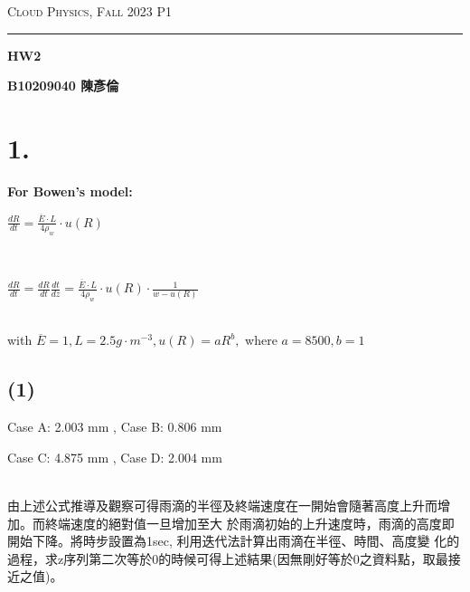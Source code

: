 \documentclass{article}
\author{B10209040 陳彥倫}
\begin{document}
\thispagestyle{empty}
\hfill {\scshape \large Cloud Physics, Fall 2023 } \hfill {\scshape P1}
\smallskip
\hrule
\begin{CJK*}{UTF8}{bsmi}
\bigskip
\bigskip
\bigskip

\centerline{\huge \textbf {HW2}}
\bigskip
\centerline{\textbf {B10209040 陳彥倫}}

\section*{1.}
\begin{spacing}{2}
    \begin{large}
        \textbf{For Bowen's model:} \\
        \centerline{$\frac{dR}{dt} = \frac{\overline{E}\cdot L}{4\rho_w} \cdot u(R)$} \\
        \centerline{$\frac{dR}{dt} = \frac{dR}{dt} \frac{dt}{dz} = \frac{\overline{E}\cdot L}{4\rho_w} \cdot u(R) \cdot \frac{1}{w - u(R)}$} \\
        with $\overline{E} = 1, L = 2.5g \cdot m^{-3}, u(R) = aR^b, $ where $a = 8500, b = 1 $
    \end{large}
\end{spacing}


\subsection*{(1)}
\begin{spacing}{1.5}
    \begin{large}
        \centerline{Case A: 2.003 mm , Case B: 0.806 mm }
        \centerline{Case C: 4.875 mm , Case D: 2.004 mm }
        \; \\
            由上述公式推導及觀察可得雨滴的半徑及終端速度在一開始會隨著高度上升而增加。而終端速度的絕對值一旦增加至大
            於雨滴初始的上升速度時，雨滴的高度即開始下降。將時步設置為1sec, 利用迭代法計算出雨滴在半徑、時間、高度變
            化的過程，求z序列第二次等於0的時候可得上述結果(因無剛好等於0之資料點，取最接近之值)。
    \end{large}
\end{spacing}



\end{CJK*}
\end{document}
